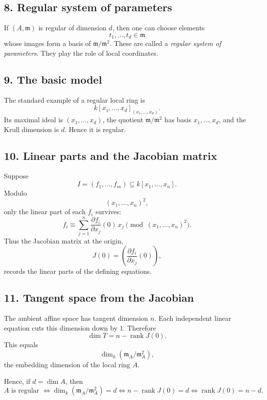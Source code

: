 \documentclass[12pt,a4paper]{article}
\theoremstyle{plain}
\theoremstyle{definition}      %
\begin{document}
	\subsection*{8. Regular system of parameters}
	
	If \((A,\mathfrak m)\) is regular of dimension \(d\), then one can choose elements
	\[
	t_1,\dots,t_d\in\mathfrak m
	\]
	whose images form a basis of \(\mathfrak m/\mathfrak m^2\). These are called a \emph{regular system of parameters}. They play the role of local coordinates.
	
	\subsection*{9. The basic model}
	
	The standard example of a regular local ring is
	\[
	k[x_1,\dots,x_d]_{(x_1,\dots,x_d)}.
	\]
	Its maximal ideal is \((x_1,\dots,x_d)\), the quotient \(\mathfrak m/\mathfrak m^2\) has basis \(x_1,\dots,x_d\), and the Krull dimension is \(d\). Hence it is regular.
	
	\subsection*{10. Linear parts and the Jacobian matrix}
	
	Suppose
	\[
	I=(f_1,\dots,f_m)\subseteq k[x_1,\dots,x_n].
	\]
	Modulo
	\[
	(x_1,\dots,x_n)^2,
	\]
	only the linear part of each \(f_i\) survives:
	\[
	f_i \equiv \sum_{j=1}^n \frac{\partial f_i}{\partial x_j}(0)\,x_j
	\pmod{(x_1,\dots,x_n)^2}.
	\]
	Thus the Jacobian matrix at the origin,
	\[
	J(0)=\left(\frac{\partial f_i}{\partial x_j}(0)\right),
	\]
	records the linear parts of the defining equations.
	
	\subsection*{11. Tangent space from the Jacobian}
	
	The ambient affine space has tangent dimension \(n\). Each independent linear equation cuts this dimension down by \(1\). Therefore
	\[
	\dim T = n-\operatorname{rank}J(0).
	\]
	This equals
	\[
	\dim_k(\mathfrak m_A/\mathfrak m_A^2),
	\]
	the embedding dimension of the local ring \(A\).
	
	Hence, if \(d=\dim A\), then
	\[
	A \text{ is regular }
	\iff
	\dim_k(\mathfrak m_A/\mathfrak m_A^2)=d
	\iff
	n-\operatorname{rank}J(0)=d
	\iff
	\operatorname{rank}J(0)=n-d.
	\]
	
\end{document}
